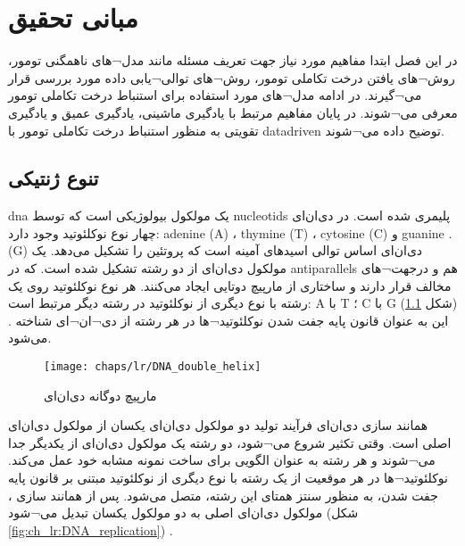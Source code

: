 
\chapter{مبانی تحقیق}

در این فصل ابتدا مفاهیم مورد نیاز جهت تعریف مسئله مانند مدل¬های ناهمگنی تومور،‌ روش¬های یافتن درخت تکاملی تومور، روش¬های توالی¬یابی داده مورد بررسی قرار می¬گیرند. در ادامه مدل¬های مورد استفاده برای استنباط درخت تکاملی تومور معرفی می¬شوند. در پایان مفاهیم مرتبط با یادگیری ماشینی، یادگیری عمیق و یادگیری تقویتی به منظور استنباط درخت تکاملی تومور با \gls{datadriven}  توضیح داده می¬شوند.


\section{تنوع ژنتیکی}

\gls{dna}  یک مولکول بیولوژیکی است که توسط \glspl{nucleotid}  پلیمری شده است. در دی‌ان‌ای چهار نوع نوکلئوتید وجود دارد: \gls{adenine}  (A) ، \gls{thymine}  (T) ، \gls{cytosine}  (C) و \gls{guanine}  .(G) دی‌ان‌ای اساس توالی اسیدهای آمینه است که پروتئین را تشکیل می‌دهد. یک مولکول دی‌ان‌ای از دو رشته تشکیل شده است. که در \glspl{antiparallel}  هم و درجهت¬های مخالف قرار دارند و ساختاری از مارپیچ دوتایی ایجاد می‌کنند. هر نوع نوکلئوتید روی یک رشته با نوع دیگری از نوکلئوتید در رشته دیگر مرتبط است: A با T ؛ C با G (شکل \ref{fig:ch_lr:DNA_double_helix}) \cite{alberts2002molecular}. این به عنوان قانون پایه جفت شدن نوکلئوتید¬ها در هر رشته از دی¬ان¬ای شناخته می‌شود.


\begin{figure}[!ht]
	\centerline{\texttt{[image: chaps/lr/DNA\_double\_helix]}}
	\caption{مارپیچ دوگانه دی‌ان‌ای}
	\label{fig:ch_lr:DNA_double_helix}
\end{figure}



همانند سازی دی‌ان‌ای فرآیند تولید دو مولکول دی‌ان‌ای یکسان از مولکول دی‌ان‌ای اصلی است. وقتی تکثیر شروع می¬شود، دو رشته یک مولکول دی‌ان‌ای از یکدیگر جدا می¬شوند و هر رشته به عنوان الگویی برای ساخت نمونه مشابه خود عمل می‌کند. نوکلئوتید¬ها در هر موقعیت از یک رشته با نوع دیگری از نوکلئوتید مبتنی بر قانون پایه جفت شدن، به منظور سنتز همتای این رشته، متصل می‌شود. پس از همانند سازی ، مولکول دی‌ان‌ای اصلی به دو مولکول یکسان تبدیل می¬شود (شکل \ref{fig:ch_lr:DNA_replication}) \cite{alberts2002molecular}.

